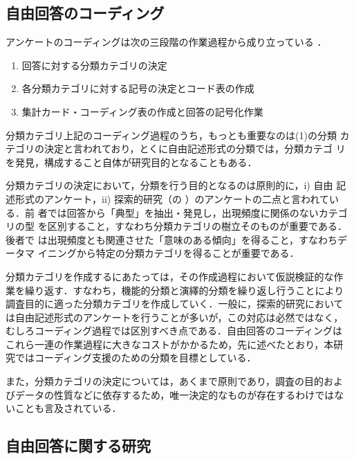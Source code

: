 \subsection{自由回答のコーディング}

アンケートのコーディングは次の三段階の作業過程から成り立っている
\cite{tsuzuki:75}．

\begin{enumerate}
\item 回答に対する分類カテゴリの決定
\item 各分類カテゴリに対する記号の決定とコード表の作成
\item 集計カード・コーディング表の作成と回答の記号化作業
\end{enumerate}

分類カテゴリ上記のコーディング過程のうち，もっとも重要なのは(1)の分類
カテゴリの決定と言われており，とくに自由記述形式の分類では，分類カテゴ
リを発見，構成すること自体が研究目的となることもある．

分類カテゴリの決定において，分類を行う目的となるのは原則的に，i) 自由
記述形式のアンケート，ii) 探索的研究（の
）のアンケートの二点と言われている\cite{tsuzuki:75}．前
者では回答から「典型」を抽出・発見し，出現頻度に関係のないカテゴリの型
を区別すること，すなわち分類カテゴリの樹立そのものが重要である．後者で
は出現頻度とも関連させた「意味のある傾向」を得ること，すなわちデータマ
イニングから特定の分類カテゴリを得ることが重要である．

分類カテゴリを作成するにあたっては，その作成過程において仮説検証的な作
業を繰り返す．すなわち，機能的分類と演繹的分類を繰り返し行うことにより
調査目的に適った分類カテゴリを作成していく．一般に，探索的研究において
は自由記述形式のアンケートを行うことが多いが，この対応は必然ではなく，
むしろコーディング過程では区別すべき点である．自由回答のコーディングは
これら一連の作業過程に大きなコストがかかるため，先に述べたとおり，本研
究ではコーディング支援のための分類を目標としている．

また，分類カテゴリの決定については，あくまで原則であり，調査の目的およ
びデータの性質などに依存するため，唯一決定的なものが存在するわけではな
いことも言及されている\cite{tsuzuki:75}．

\subsection{自由回答に関する研究}
\label{ssec:related_work}

